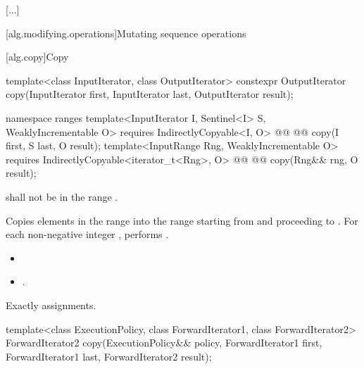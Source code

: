 [...]

[alg.modifying.operations]{Mutating sequence operations}

[alg.copy]{Copy}

%
\begin{itemdecl}
template<class InputIterator, class OutputIterator>
  constexpr OutputIterator copy(InputIterator first, InputIterator last,
                                OutputIterator result);
\end{itemdecl}\begin{addedblock}\begin{itemdecl}
namespace ranges {
  template<InputIterator I, Sentinel<I> S, WeaklyIncrementable O>
    requires IndirectlyCopyable<I, O>
    @@
    @@
      copy(I first, S last, O result);
  template<InputRange Rng, WeaklyIncrementable O>
    requires IndirectlyCopyable<iterator_t<Rng>, O>
    @@
    @@
      copy(Rng&& rng, O result);
}
\end{itemdecl}\end{addedblock}

\begin{itemdescr}
\pnum
\requires {} shall not be in the range .

\pnum
\effects Copies elements in the range  into the range  starting from  and proceeding to . For each non-negative integer
 , performs
.

\pnum
\returns
\begin{itemize}
\item {} 
\item {} .
\end{itemize}

\pnum
\complexity Exactly  assignments.
\end{itemdescr}

%
\begin{itemdecl}
template<class ExecutionPolicy, class ForwardIterator1, class ForwardIterator2>
  ForwardIterator2 copy(ExecutionPolicy&& policy,
                        ForwardIterator1 first, ForwardIterator1 last,
                        ForwardIterator2 result);
\end{itemdecl}


